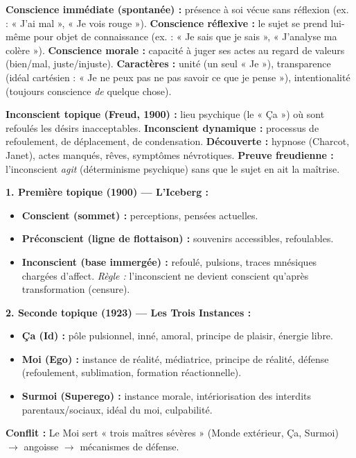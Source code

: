 \documentclass[11pt]{article}
\newcounter{popsec}
\newcounter{popsub}
\newcommand{\courssub}[1]{%
  \stepcounter{popsub}%
  \par\vspace{9pt}\noindent{\popxbold\fontsize{11.5}{13}\selectfont\color{popink}{\color{poporange}\thepopsec.\thepopsub}\hspace{6pt}#1}\par\nopagebreak\vspace{4pt}
}
\begin{document}
\courssub{Ressources à mobiliser}
\begin{definition}
\textbf{Conscience immédiate (spontanée) :} présence à soi vécue sans réflexion (ex. : « J'ai mal », « Je vois rouge »).
\textbf{Conscience réflexive :} le sujet se prend lui-même pour objet de connaissance (ex. : « Je sais que je sais », « J'analyse ma colère »).
\textbf{Conscience morale :} capacité à juger ses actes au regard de valeurs (bien/mal, juste/injuste). \textbf{Caractères :} unité (un seul « Je »), transparence (idéal cartésien : « Je ne peux pas ne pas savoir ce que je pense »), intentionalité (toujours conscience \emph{de} quelque chose).
\end{definition}

\begin{definition}
\textbf{Inconscient topique (Freud, 1900) :} lieu psychique (le « Ça ») où sont refoulés les désirs inacceptables. \textbf{Inconscient dynamique :} processus de refoulement, de déplacement, de condensation. \textbf{Découverte :} hypnose (Charcot, Janet), actes manqués, rêves, symptômes névrotiques. \textbf{Preuve freudienne :} l'inconscient \emph{agit} (déterminisme psychique) sans que le sujet en ait la maîtrise.
\end{definition}

\begin{propriete}
\textbf{1. Première topique (1900) — L'Iceberg :}
\begin{itemize}
    \item \textbf{Conscient (sommet) :} perceptions, pensées actuelles.
    \item \textbf{Préconscient (ligne de flottaison) :} souvenirs accessibles, refoulables.
    \item \textbf{Inconscient (base immergée) :} refoulé, pulsions, traces mnésiques chargées d'affect. \emph{Règle :} l'inconscient ne devient conscient qu'après transformation (censure).
\end{itemize}
\textbf{2. Seconde topique (1923) — Les Trois Instances :}
\begin{itemize}
    \item \textbf{Ça (Id) :} pôle pulsionnel, inné, amoral, principe de plaisir, énergie libre.
    \item \textbf{Moi (Ego) :} instance de réalité, médiatrice, principe de réalité, défense (refoulement, sublimation, formation réactionnelle).
    \item \textbf{Surmoi (Superego) :} instance morale, intériorisation des interdits parentaux/sociaux, idéal du moi, culpabilité.
\end{itemize}
\textbf{Conflit :} Le Moi sert « trois maîtres sévères » (Monde extérieur, Ça, Surmoi) $\rightarrow$ angoisse $\rightarrow$ mécanismes de défense.
\end{propriete}
\end{document}
